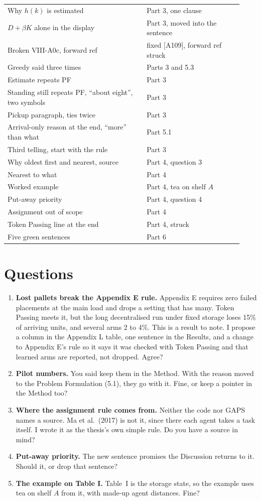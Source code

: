 \documentclass[11pt,a4paper]{article}
\begin{document}
\begin{longtable}{p{0.55\linewidth}p{0.38\linewidth}}
Why $h(k)$ is estimated & Part 3, one clause \\
$D+\beta K$ alone in the display & Part 3, moved into the sentence \\
Broken VIII-A0c, forward ref & fixed [A109], forward ref struck \\
Greedy said three times & Parts 3 and 5.3 \\
Estimate repeats PF & Part 3 \\
Standing still repeats PF, ``about eight'', two symbols & Part 3 \\
Pickup paragraph, ties twice & Part 3 \\
Arrival-only reason at the end, ``more'' than what & Part 5.1 \\
Third telling, start with the rule & Part 3 \\
Why oldest first and nearest, source & Part 4, question 3 \\
Nearest to what & Part 4 \\
Worked example & Part 4, tea on shelf $A$ \\
Put-away priority & Part 4, question 4 \\
Assignment out of scope & Part 4 \\
Token Passing line at the end & Part 4, struck \\
Five green sentences & Part 6 \\
\bottomrule
\end{longtable}
\normalsize

\section*{Questions}
\begin{enumerate}
  \item \textbf{Lost pallets break the Appendix E rule.} Appendix E requires
    zero failed placements at the main load and drops a setting that has
    many. Token Passing meets it, but the long decentralised run under
    fixed storage loses 15\% of arriving units, and several arms 2 to 4\%.
    This is a result to note. I propose a column in the Appendix L table,
    one sentence in the Results, and a change to Appendix E's rule so it
    says it was checked with Token Passing and that learned arms are
    reported, not dropped. Agree?
  \item \textbf{Pilot numbers.} You said keep them in the Method. With the
    reason moved to the Problem Formulation (5.1), they go with it. Fine, or
    keep a pointer in the Method too?
  \item \textbf{Where the assignment rule comes from.} Neither the code nor
    GAPS names a source. Ma et al.\ (2017) is not it, since there each agent
    takes a task itself. I wrote it as the thesis's own simple rule. Do you
    have a source in mind?
  \item \textbf{Put-away priority.} The new sentence promises the Discussion
    returns to it. Should it, or drop that sentence?
  \item \textbf{The example on Table I.} Table~I is the storage state, so the
    example uses tea on shelf $A$ from it, with made-up agent distances.
    Fine?
\end{enumerate}
\end{document}
